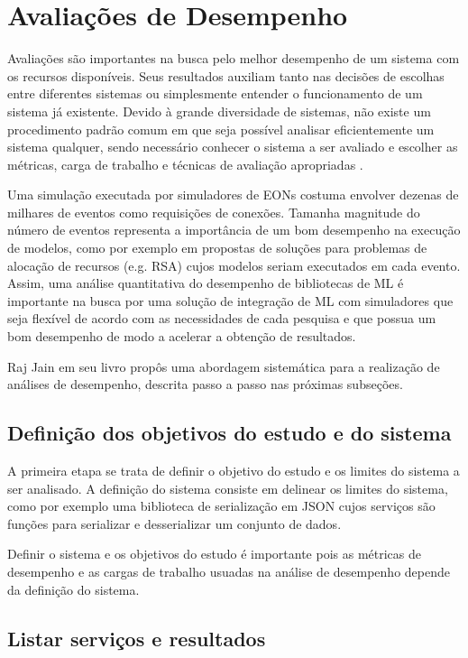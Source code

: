 \section{Avaliações de Desempenho}
\label{performance_analysis_theory}

Avaliações são importantes na busca pelo melhor desempenho de um sistema com os recursos disponíveis. Seus resultados auxiliam tanto nas decisões de escolhas entre diferentes sistemas ou simplesmente entender o funcionamento de um sistema já existente. Devido à grande diversidade de sistemas, não existe um procedimento padrão comum em que seja possível analisar eficientemente um sistema qualquer, sendo necessário conhecer o sistema a ser avaliado e escolher as métricas, carga de trabalho e técnicas de avaliação apropriadas \cite{jain1991art}.

Uma simulação executada por simuladores de EONs costuma envolver dezenas de milhares de eventos como requisições de conexões. Tamanha magnitude do número de eventos representa a importância de um bom desempenho na execução de modelos, como por exemplo em propostas de soluções para problemas de alocação de recursos (e.g. RSA) cujos modelos seriam executados em cada evento. Assim, uma análise quantitativa do desempenho de bibliotecas de ML é importante na busca por uma solução de integração de ML com simuladores que seja flexível de acordo com as necessidades de cada pesquisa e que possua um bom desempenho de modo a acelerar a obtenção de resultados.

Raj Jain em seu livro \cite{jain1991art} propôs uma abordagem sistemática para a realização de análises de desempenho, descrita passo a passo nas próximas subseções.

\subsection{Definição dos objetivos do estudo e do sistema}

A primeira etapa se trata de definir o objetivo do estudo e os limites do sistema a ser analisado. A definição do sistema consiste em delinear os limites do sistema, como por exemplo uma biblioteca de serialização em JSON cujos serviços são funções para serializar e desserializar um conjunto de dados.

Definir o sistema e os objetivos do estudo é importante pois as métricas de desempenho e as cargas de trabalho usuadas na análise de desempenho depende da definição do sistema.

\subsection{Listar serviços e resultados}

